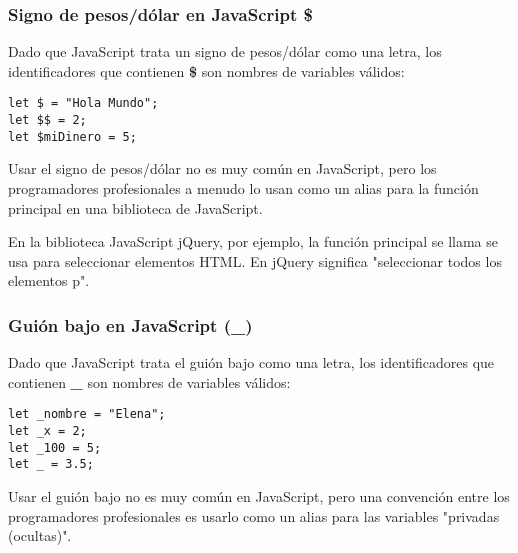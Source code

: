 \begin{frame}[fragile]
  \frametitle{Signo de pesos/dólar en JavaScript \$}

  Dado que JavaScript trata un signo de pesos/dólar como
  una letra, los identificadores que contienen \textbf{\$} son
  nombres de variables válidos:

  \vspace{\baselineskip}
  \begin{lstlisting}
let $ = "Hola Mundo";
let $$ = 2;
let $miDinero = 5;
  \end{lstlisting}

  \vspace{\baselineskip}
  Usar el signo de pesos/dólar no es muy común en JavaScript,
  pero los programadores profesionales a menudo lo usan como
  un alias para la función principal en una biblioteca de
  JavaScript.

  \vspace{\baselineskip}
  En la biblioteca JavaScript jQuery, por ejemplo, la función
  principal se llama \eti{\$} se usa para seleccionar elementos
  HTML. En jQuery  significa "seleccionar todos
  los elementos p".
\end{frame}

\begin{frame}[fragile]
  \frametitle{Guión bajo en JavaScript (\_)}

  Dado que JavaScript trata el guión bajo como una letra,
  los identificadores que contienen \textbf{\_} son nombres
  de variables válidos:

  \vspace{\baselineskip}
  \begin{lstlisting}
let _nombre = "Elena";
let _x = 2;
let _100 = 5;
let _ = 3.5;
  \end{lstlisting}

  \vspace{\baselineskip}
  Usar el guión bajo no es muy común en JavaScript, pero una
  convención entre los programadores profesionales es usarlo
  como un alias para las variables "privadas (ocultas)".
\end{frame}
